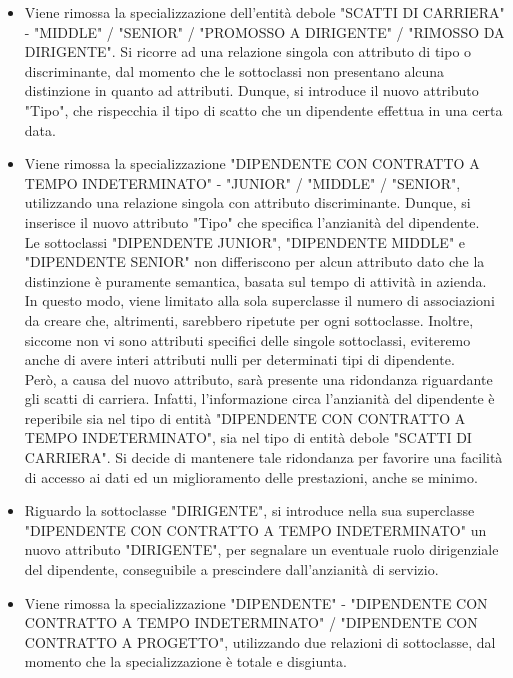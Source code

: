             \begin{itemize}
                \item Viene rimossa la specializzazione dell'entità debole "SCATTI DI CARRIERA" - "MIDDLE" / "SENIOR" / "PROMOSSO A DIRIGENTE" / "RIMOSSO DA DIRIGENTE".  Si ricorre ad una relazione singola con attributo di tipo o discriminante, dal momento che le sottoclassi non presentano alcuna distinzione in quanto ad attributi. Dunque, si introduce il nuovo attributo "Tipo", che rispecchia il tipo di scatto che un dipendente effettua in una certa data.
                \item Viene rimossa la specializzazione "DIPENDENTE CON CONTRATTO A TEMPO INDETERMINATO" - "JUNIOR" / "MIDDLE" / "SENIOR", utilizzando una relazione singola con attributo discriminante. Dunque, si inserisce il nuovo attributo "Tipo" che specifica l'anzianità del dipendente.\\
                Le sottoclassi "DIPENDENTE JUNIOR", "DIPENDENTE MIDDLE" e "DIPENDENTE SENIOR" non differiscono per alcun attributo dato che la distinzione è puramente semantica, basata sul tempo di attività in azienda.\\
                In questo modo, viene limitato alla sola superclasse il numero di associazioni da creare che, altrimenti, sarebbero ripetute per ogni sottoclasse. Inoltre, siccome non vi sono attributi specifici delle singole sottoclassi, eviteremo anche di avere interi attributi nulli per determinati tipi di dipendente.\\
                Però, a causa del nuovo attributo, sarà presente una ridondanza riguardante gli scatti di carriera. Infatti, l'informazione circa l'anzianità del dipendente è reperibile sia nel tipo di entità "DIPENDENTE CON CONTRATTO A TEMPO INDETERMINATO", sia nel tipo di entità debole "SCATTI DI CARRIERA". Si decide di mantenere tale ridondanza per favorire una facilità di accesso ai dati ed un miglioramento delle prestazioni, anche se minimo.
                \item Riguardo la sottoclasse "DIRIGENTE", si introduce nella sua superclasse "DIPENDENTE CON CONTRATTO A TEMPO INDETERMINATO" un nuovo attributo "DIRIGENTE", per segnalare un eventuale ruolo dirigenziale del dipendente, conseguibile a prescindere dall'anzianità di servizio.
                \item Viene rimossa la specializzazione "DIPENDENTE" - "DIPENDENTE CON CONTRATTO A TEMPO INDETERMINATO" / "DIPENDENTE CON CONTRATTO A PROGETTO", utilizzando due relazioni di sottoclasse, dal momento che la specializzazione è totale e disgiunta.
            \end{itemize}
            
